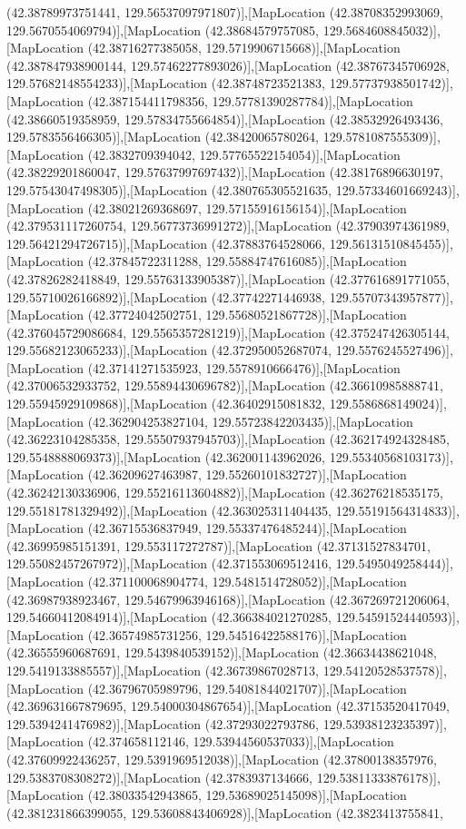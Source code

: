 (42.38789973751441, 129.56537097971807)],[MapLocation (42.38708352993069, 129.5670554069794)],[MapLocation (42.38684579757085, 129.5684608845032)],[MapLocation (42.38716277385058, 129.5719906715668)],[MapLocation (42.387847938900144, 129.57462277893026)],[MapLocation (42.38767345706928, 129.57682148554233)],[MapLocation (42.38748723521383, 129.57737938501742)],[MapLocation (42.387154411798356, 129.57781390287784)],[MapLocation (42.38660519358959, 129.57834755664854)],[MapLocation (42.38532926493436, 129.5783556466305)],[MapLocation (42.38420065780264, 129.5781087555309)],[MapLocation (42.3832709394042, 129.57765522154054)],[MapLocation (42.38229201860047, 129.57637997697432)],[MapLocation (42.38176896630197, 129.57543047498305)],[MapLocation (42.380765305521635, 129.57334601669243)],[MapLocation (42.38021269368697, 129.57155916156154)],[MapLocation (42.379531117260754, 129.56773736991272)],[MapLocation (42.37903974361989, 129.56421294726715)],[MapLocation (42.37883764528066, 129.56131510845455)],[MapLocation (42.37845722311288, 129.55884747616085)],[MapLocation (42.37826282418849, 129.55763133905387)],[MapLocation (42.377616891771055, 129.55710026166892)],[MapLocation (42.37742271446938, 129.55707343957877)],[MapLocation (42.37724042502751, 129.55680521867728)],[MapLocation (42.376045729086684, 129.5565357281219)],[MapLocation (42.375247426305144, 129.55682123065233)],[MapLocation (42.372950052687074, 129.5576245527496)],[MapLocation (42.37141271535923, 129.5578910666476)],[MapLocation (42.37006532933752, 129.55894430696782)],[MapLocation (42.36610985888741, 129.55945929109868)],[MapLocation (42.36402915081832, 129.5586868149024)],[MapLocation (42.362904253827104, 129.55723842203435)],[MapLocation (42.36223104285358, 129.55507937945703)],[MapLocation (42.362174924328485, 129.5548888069373)],[MapLocation (42.362001143962026, 129.55340568103173)],[MapLocation (42.36209627463987, 129.55260101832727)],[MapLocation (42.36242130336906, 129.55216113604882)],[MapLocation (42.36276218535175, 129.55181781329492)],[MapLocation (42.363025311404435, 129.55191564314833)],[MapLocation (42.36715536837949, 129.55337476485244)],[MapLocation (42.36995985151391, 129.553117272787)],[MapLocation (42.37131527834701, 129.55082457267972)],[MapLocation (42.371553069512416, 129.5495049258444)],[MapLocation (42.371100068904774, 129.5481514728052)],[MapLocation (42.36987938923467, 129.54679963946168)],[MapLocation (42.367269721206064, 129.54660412084914)],[MapLocation (42.366384021270285, 129.54591524440593)],[MapLocation (42.36574985731256, 129.54516422588176)],[MapLocation (42.36555960687691, 129.5439840539152)],[MapLocation (42.36634438621048, 129.5419133885557)],[MapLocation (42.36739867028713, 129.54120528537578)],[MapLocation (42.36796705989796, 129.54081844021707)],[MapLocation (42.369631667879695, 129.54000304867654)],[MapLocation (42.37153520417049, 129.5394241476982)],[MapLocation (42.37293022793786, 129.53938123235397)],[MapLocation (42.374658112146, 129.53944560537033)],[MapLocation (42.37609922436257, 129.5391969512038)],[MapLocation (42.37800138357976, 129.5383708308272)],[MapLocation (42.3783937134666, 129.53811333876178)],[MapLocation (42.38033542943865, 129.53689025145098)],[MapLocation (42.381231866399055, 129.53608843406928)],[MapLocation (42.3823413755841, 
